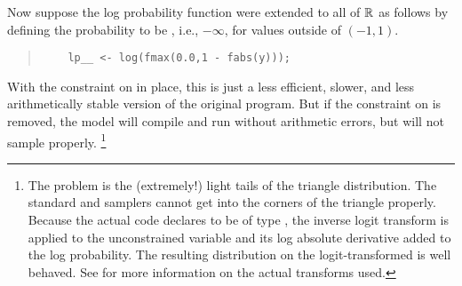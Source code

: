 Now suppose the log probability function were extended to all of
$\mathbb{R}$ as follows by defining the probability to be ,
i.e., $-\infty$, for values outside of $(-1,1)$.
%
\begin{quote}
\begin{Verbatim}
    lp__ <- log(fmax(0.0,1 - fabs(y)));
\end{Verbatim}
\end{quote}
%
With the constraint on  in place, this is just a less
efficient, slower, and less arithmetically stable version of the
original program.  But if the constraint on  is removed, 
the model will compile and run without arithmetic errors, but will not
sample properly.%
%
\footnote{The problem is the (extremely!) light tails of the triangle
  distribution.  The standard \HMC and \NUTS samplers cannot get into the
  corners of the triangle properly.  Because the actual code declares
   to be of type , the inverse logit
  transform is applied to the unconstrained variable and its log
  absolute derivative added to the log probability.  The resulting
  distribution on the logit-transformed  is well behaved.  See
   for more information on the actual
  transforms used.}


